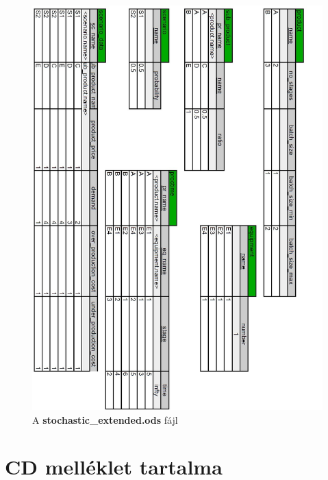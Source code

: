 \begin{figure}[H]
\begin{center}
\includegraphics[scale=0.5]{stochasticExtendedOds}
\caption{A \textbf{stochastic\_extended.ods} fájl}
\label{stochastic_extended_ods}
\end{center}
\end{figure}
\chapter{CD melléklet tartalma}